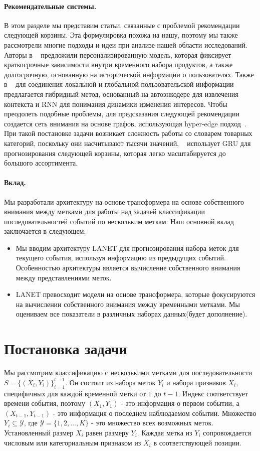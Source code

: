 \documentclass[a4paper, 12pt]{article} %
\begin{document}
\paragraph{\textbf{Рекомендательные системы.}}
В этом разделе мы представим статьи, связанные с проблемой рекомендации следующей корзины. Эта формулировка похожа на нашу, поэтому мы также рассмотрели многие подходы и идеи при анализе нашей области исследований. Авторы в ~\cite{ariannezhad2023personalized} предложили персонализированную модель, которая фиксирует краткосрочные зависимости внутри временного набора продуктов, а также долгосрочную, основанную на исторической информации о пользователях. Также в ~\cite{yannam2023hybrid} для соединения локальной и глобальной пользовательской информации предлагается гибридный метод, основанный на автоэнкодере для извлечения контекста и RNN для понимания динамики изменения интересов. Чтобы преодолеть подобные проблемы, для предсказания следующей рекомендации создается сеть внимания на основе графов, использующая hyper-edge подход~\cite{song2023hgat}.
При такой постановке задачи возникает сложность работы со словарем товарных категорий, поскольку они насчитывают тысячи значений, ~\cite{van2023next} использует GRU для прогнозирования следующей корзины, которая легко масштабируется до большого ассортимента.


\paragraph{\textbf{Вклад.}}
Мы разработали архитектуру на основе трансформера на основе собственного внимания между метками для работы над задачей классификации последовательностей событий по нескольким меткам. Наш основной вклад заключается в следующем:
\begin{itemize}
    \item Мы вводим архитектуру LANET для прогнозирования набора меток для текущего события, используя информацию из предыдущих событий. Особенностью архитектуры является вычисление собственного внимания между представлениями меток.  
    \item LANET превосходит модели на основе трансформера, которые фокусируются на вычислении собственного внимания между временными метками. Мы оцениваем все показатели в различных наборах данных(будет дополнение).
\end{itemize}


\section{Постановка задачи}
Мы рассмотрим классификацию с несколькими метками для последовательности $S = \{(X_{i}, Y_{i})\}_{i = 1}^{t-1}$. Он состоит из набора меток $Y_i$ и набора признаков $X_{i}$, специфичных для каждой временной метки от $1$ до $t-1$. Индекс соответствует времени события, поэтому $(X_{1}, Y_{1})$ - это информация о первом событии, а $(X_{t-1}, Y_{t-1})$ - это информация о последнем наблюдаемом событии.
Множество $Y_i \subseteq \mathcal{Y}$, где $\mathcal{Y} = \{1, 2, \dots, K\}$ - это множество всех возможных меток. Установленный размер $X_{i}$ равен размеру $Y_{i}$. Каждая метка из $Y_{i}$ сопровождается числовым или категориальным признаком из $X_{i}$ в соответствующей позиции.
\end{document}
